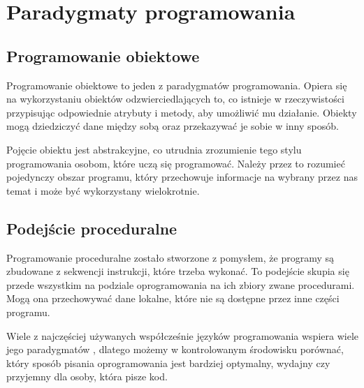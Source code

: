 \newpage

\section{Paradygmaty programowania}

\subsection{Programowanie obiektowe}

\begin{flushleft}
    Programowanie obiektowe to jeden z paradygmatów programowania. Opiera się na wykorzystaniu obiektów odzwierciedlających to, co istnieje w rzeczywistości przypisując odpowiednie atrybuty i metody, aby umożliwić mu działanie. Obiekty mogą dziedziczyć  dane między sobą oraz \linebreak przekazywać je  sobie w inny sposób.
\end{flushleft}

\begin{flushleft}
    Pojęcie obiektu jest abstrakcyjne, co utrudnia zrozumienie tego stylu programowania osobom, które uczą się programować. Należy przez to rozumieć pojedynczy obszar programu, który przechowuje informacje na wybrany przez nas temat i może być wykorzystany wielokrotnie.
\end{flushleft}

\subsection{Podejście proceduralne}

\begin{flushleft}
    Programowanie proceduralne zostało stworzone z pomysłem, że programy są zbudowane z sekwencji instrukcji, które trzeba wykonać. To podejście skupia się przede wszystkim na podziale oprogramowania na ich zbiory zwane procedurami. \cite{procedure-deepsource} Mogą ona przechowywać dane lokalne, które nie są dostępne przez inne części programu.
\end{flushleft}

\begin{mdframed}[backgroundcolor=yellow!20]
    Wiele z najczęściej używanych współcześnie języków programowania \linebreak wspiera wiele jego paradygmatów \cite{oop-wikipedia}, dlatego możemy w kontrolowanym środowisku porównać, który sposób pisania oprogramowania jest bardziej optymalny, wydajny czy przyjemny dla osoby, która pisze kod.
\end{mdframed}
